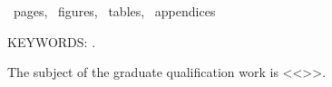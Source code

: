 ~pages, 
~figures, 
~tables,
~appendices%

{\MakeUppercase{Keywords: \keywordsEn}.} %
	
The subject of the graduate qualification work is <<\thesisTitleEn>>.
	
	
\abstractEn %

	


\thispagestyle{empty}
%
